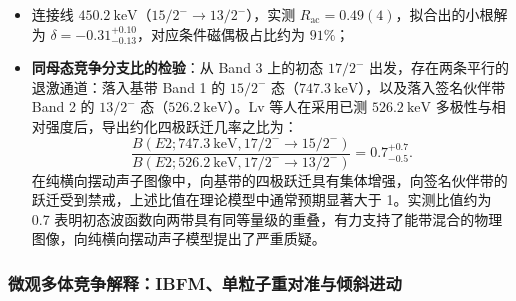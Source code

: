 \begin{enumerate}
\begin{itemize}
\begin{equation}\label{eq:4-4-pr135-small-delta-813}
\delta = -0.37_{-0.14}^{+0.10},
\end{equation}
对应条件磁偶极成分占比约为 $88\%$；
\item 连接线 $450.2\ \mathrm{keV}$（$15/2^- \to 13/2^-$），实测 $R_{\mathrm{ac}} = 0.49(4)$，拟合出的小根解为 $\delta = -0.31_{-0.13}^{+0.10}$，对应条件磁偶极占比约为 $91\%$；
\item \textbf{同母态竞争分支比的检验}：从 Band 3 上的初态 $17/2^-$ 出发，存在两条平行的退激通道：落入基带 Band 1 的 $15/2^-$ 态（$747.3\ \mathrm{keV}$），以及落入签名伙伴带 Band 2 的 $13/2^-$ 态（$526.2\ \mathrm{keV}$）。Lv 等人在采用已测 $526.2\ \mathrm{keV}$ 多极性与相对强度后，导出约化四极跃迁几率之比为：
\begin{equation}\label{eq:4-4-pr135-branch-ratio}
\frac{B(E2; 747.3\ \mathrm{keV}, 17/2^- \to 15/2^-)}{B(E2; 526.2\ \mathrm{keV}, 17/2^- \to 13/2^-)} = 0.7_{-0.5}^{+0.7}.
\end{equation}
在纯横向摆动声子图像中，向基带的四极跃迁具有集体增强，向签名伙伴带的跃迁受到禁戒，上述比值在理论模型中通常预期显著大于 1。实测比值约为 0.7 表明初态波函数向两带具有同等量级的重叠，有力支持了能带混合的物理图像，向纯横向摆动声子模型提出了严重质疑。
\end{itemize}
\end{enumerate}

\subsubsection{微观多体竞争解释：IBFM、单粒子重对准与倾斜进动}


